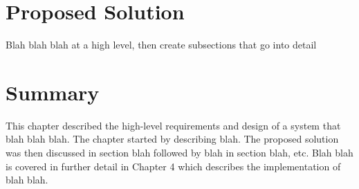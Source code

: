 \section{Proposed Solution} \label{a-d--proposed-solution}

Blah blah blah at a high level, then create subsections that go into detail

\section{Summary} \label{a-d--summary}

This chapter described the high-level requirements and design of a system that blah blah blah.  The chapter started by describing blah.  The proposed solution was then discussed in section blah followed by blah in section blah, etc.
Blah blah is covered in further detail in Chapter 4 which describes the implementation of blah blah.
